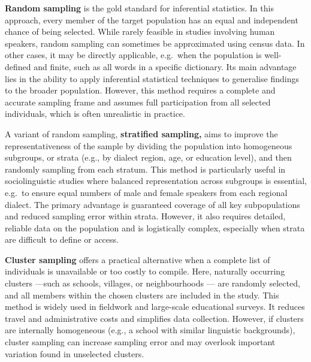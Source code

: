 \documentclass[
  letterpaper,
  DIV=11,
  numbers=noendperiod]{scrreprt}
\begin{document}
\begin{tcolorbox}[enhanced jigsaw, arc=.35mm, bottomrule=.15mm, bottomtitle=1mm, breakable, colback=white, colbacktitle=quarto-callout-note-color!10!white, colframe=quarto-callout-note-color-frame, coltitle=black, left=2mm, leftrule=.75mm, opacityback=0, opacitybacktitle=0.6, rightrule=.15mm, title=\textcolor{quarto-callout-note-color}{\faInfo}\hspace{0.5em}{Sampling methods}, titlerule=0mm, toprule=.15mm, toptitle=1mm]

\textbf{Random sampling} is the gold standard for inferential
statistics. In this approach, every member of the target population has
an equal and independent chance of being selected. While rarely feasible
in studies involving human speakers, random sampling can sometimes be
approximated using census data. In other cases, it may be directly
applicable, e.g.~when the population is well-defined and finite, such as
all words in a specific dictionary. Its main advantage lies in the
ability to apply inferential statistical techniques to generalise
findings to the broader population. However, this method requires a
complete and accurate sampling frame and assumes full participation from
all selected individuals, which is often unrealistic in practice.

A variant of random sampling, \textbf{stratified sampling,} aims to
improve the representativeness of the sample by dividing the population
into homogeneous subgroups, or strata (e.g., by dialect region, age, or
education level), and then randomly sampling from each stratum. This
method is particularly useful in sociolinguistic studies where balanced
representation across subgroups is essential, e.g.~to ensure equal
numbers of male and female speakers from each regional dialect. The
primary advantage is guaranteed coverage of all key subpopulations and
reduced sampling error within strata. However, it also requires
detailed, reliable data on the population and is logistically complex,
especially when strata are difficult to define or access.

\textbf{Cluster sampling} offers a practical alternative when a complete
list of individuals is unavailable or too costly to compile. Here,
naturally occurring clusters ---such as schools, villages, or
neighbourhoods --- are randomly selected, and all members within the
chosen clusters are included in the study. This method is widely used in
fieldwork and large-scale educational surveys. It reduces travel and
administrative costs and simplifies data collection. However, if
clusters are internally homogeneous (e.g., a school with similar
linguistic backgrounds), cluster sampling can increase sampling error
and may overlook important variation found in unselected clusters.


\end{tcolorbox}
\end{document}
